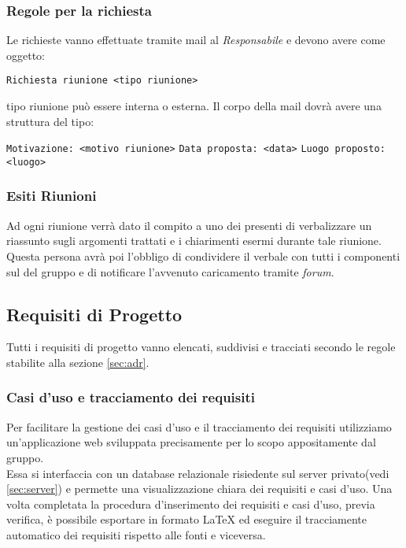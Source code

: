 \documentclass{scalatekids-article}
\begin{document}
\subsubsection{Regole per la richiesta}
Le richieste vanno effettuate tramite mail al \textit{Responsabile} e devono avere come oggetto:
\begin{center}
  \verb=Richiesta riunione <tipo riunione>=
\end{center}
tipo riunione può essere interna o esterna.
Il corpo della mail dovrà avere una struttura del tipo:
\begin{center}
  \verb=Motivazione: <motivo riunione>=
  \verb=Data proposta: <data>=
  \verb=Luogo proposto: <luogo>=
\end{center}

\subsubsection{Esiti Riunioni}
Ad ogni riunione verrà dato il compito a uno dei presenti di verbalizzare un riassunto sugli argomenti trattati e i chiarimenti esermi durante tale riunione.\\
Questa persona avrà poi l'obbligo di condividere il verbale con tutti i componenti sul \textit{} del gruppo e di notificare l'avvenuto caricamento tramite \textit{forum}.

\subsection{Requisiti di Progetto}
Tutti i requisiti di progetto vanno elencati, suddivisi e tracciati secondo le regole stabilite alla sezione \ref{sec:adr}.
\subsubsection{Casi d'uso e tracciamento dei requisiti}
\label{sec:frontend}
Per facilitare la gestione dei casi d'uso e il tracciamento dei requisiti
utilizziamo un'applicazione web sviluppata precisamente per lo scopo
appositamente dal gruppo.\\Essa si interfaccia con un database relazionale
risiedente sul server privato(vedi \ref{sec:server}) e permette una
visualizzazione chiara dei requisiti e casi d'uso. Una volta completata la
procedura d'inserimento dei requisiti e casi d'uso, previa verifica, è possibile
esportare in formato \LaTeX\xspace ed eseguire il tracciamente automatico dei
requisiti rispetto alle fonti e viceversa.
\end{document}
